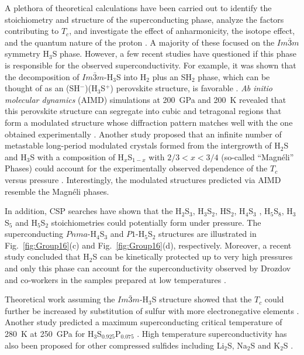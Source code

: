 \documentclass[12pt,letterpaper,oneside]{article}
\begin{document}
A plethora of theoretical calculations have been carried out to identify the stoichiometry and structure of the superconducting phase, analyze the factors contributing to $T_c$, and investigate the effect of anharmonicity, the isotope effect, and the quantum nature of the proton \cite{Flores:2016a,Papaconstantopoulos:2015,Bernstein:2015,Duan:2015-S,Errea:2015a,Akashi:2015-S,Errea:2016,Quan:2016a,Sano:2016a,Ortenzi:2016a,Gorkov:2016a,Goncharov:2016a,Bussmann:2017-S,Durajski:2016-S-P,Jarlborg:2016a,Szczkesniak:2017-S,Azadi:2017,Durajski:2015-S,Arita:2017a}. A majority of these focused on the $Im\bar{3}m$ symmetry H$_3$S phase. However, a few recent studies have questioned if this phase is responsible for the observed superconductivity. For example, it was shown that the decomposition of $Im\bar{3}m$-H$_3$S into H$_2$ plus an SH$_2$ phase, which can be thought of as an (SH$^-$)(H$_3$S$^+$) perovskite structure, is favorable \cite{Gordon:2016}. \emph{Ab initio molecular dynamics} (AIMD) simulations at 200~GPa and 200~K revealed that this perovskite structure can segregate into cubic and tetragonal regions that form a modulated structure whose diffraction pattern matches well with the one obtained experimentally \cite{Majumdar:S-2017}. Another study proposed that an infinite number of metastable long-period modulated crystals formed from the intergrowth of H$_2$S and H$_3$S with a composition of H$_x$S$_{1-x}$ with $2/3<x<3/4$ (so-called ``Magn\'eli'' Phases) could account for the experimentally observed dependence of the $T_c$ versus pressure \cite{Akashi:2016a}. Interestingly, the modulated structures predicted via AIMD resemble the Magn\'eli phases.


% 
In addition, CSP searches have shown that the H$_2$S$_3$, H$_3$S$_2$, HS$_2$, H$_4$S$_3$ \cite{Li:2016-S}, H$_5$S$_8$, H$_3$S$_5$ \cite{Goncharov:2016a} and H$_5$S$_2$ \cite{Ishikawa:2016} stoichiometries could potentially form under pressure. The superconducting $Pnma$-H$_4$S$_3$ and $P1$-H$_5$S$_2$ structures are illustrated in Fig.\ \ref{fig:Group16}(c) and Fig.\ \ref{fig:Group16}(d), respectively. Moreover, a recent study concluded that H$_2$S can be kinetically protected up to very high pressures and only this phase can account for the superconductivity observed by Drozdov and co-workers in the samples prepared at low temperatures \cite{Li:2016-S}. 

 




Theoretical work assuming the $Im\bar{3}m$-H$_3$S structure showed that the $T_c$ could further be increased by substitution of sulfur with more electronegative elements \cite{Heil:2015a}. Another study predicted a maximum superconducting critical temperature of 280~K at 250~GPa for H$_3$S$_{0.925}$P$_{0.075}$ \cite{Ge:2016-S}. High temperature superconductivity has also been proposed for other compressed sulfides including Li$_2$S, Na$_2$S and K$_2$S \cite{Hirsch:2015-S}. \\
\end{document}

